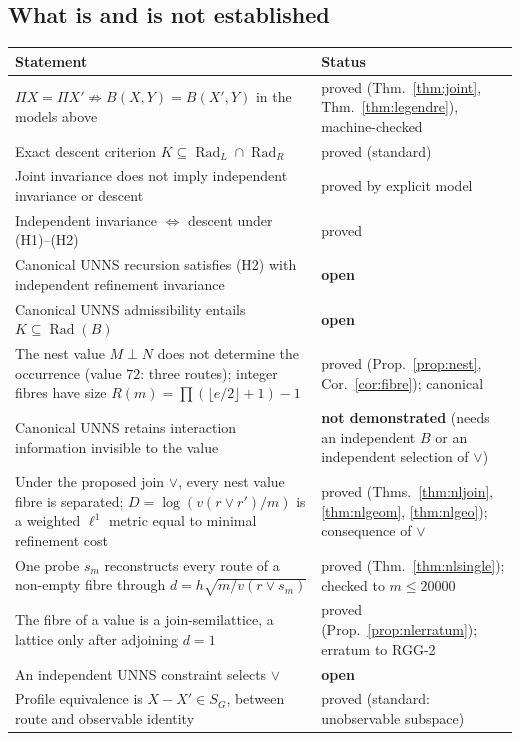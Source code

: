 \documentclass[11pt,a4paper]{article}
\newcommand{\Rad}{\operatorname{Rad}}
\newcommand{\vj}{\mathbin{\vee}}
\theoremstyle{plain}
\theoremstyle{definition}
\begin{document}
\subsection{What is and is not established}
\begin{center}\small
\begin{tabularx}{\textwidth}{@{}>{\raggedright\arraybackslash}X>{\raggedright\arraybackslash}p{}@{}}
\toprule
Statement & Status\\
\midrule
$\Pi X=\Pi X'\not\Rightarrow B(X,Y)=B(X',Y)$ in the models above & proved (Thm.~\ref{thm:joint}, Thm.~\ref{thm:legendre}), machine-checked\\
Exact descent criterion $K\subseteq\Rad_L\cap\Rad_R$ & proved (standard)\\
Joint invariance does not imply independent invariance or descent & proved by explicit model\\
Independent invariance $\Leftrightarrow$ descent under (H1)--(H2) & proved\\
Canonical UNNS recursion satisfies (H2) with independent refinement invariance & \textbf{open}\\
Canonical UNNS admissibility entails $K\subseteq\Rad(B)$ & \textbf{open}\\
The nest value $M\perp N$ does not determine the occurrence (value $72$: three routes); integer fibres have size $R(m)=\prod(\lfloor e/2\rfloor+1)-1$ & proved (Prop.~\ref{prop:nest}, Cor.~\ref{cor:fibre}); canonical\\
Canonical UNNS retains interaction information invisible to the value & \textbf{not demonstrated} (needs an independent $B$ or an independent selection of $\vj$)\\
Under the proposed join $\vj$, every nest value fibre is separated; $D=\log(v(r\vj r')/m)$ is a weighted $\ell^1$ metric equal to minimal refinement cost & proved (Thms.~\ref{thm:nljoin}, \ref{thm:nlgeom}, \ref{thm:nlgeo}); consequence of $\vj$\\
One probe $s_m$ reconstructs every route of a non-empty fibre through $d=h\sqrt{m/v(r\vj s_m)}$ & proved (Thm.~\ref{thm:nlsingle}); checked to $m\le20000$\\
The fibre of a value is a join-semilattice, a lattice only after adjoining $d=1$ & proved (Prop.~\ref{prop:nlerratum}); erratum to RGG-2\\
An independent UNNS constraint selects $\vj$ & \textbf{open}\\
Profile equivalence is $X-X'\in S_G$, between route and observable identity & proved (standard: unobservable subspace)\\

\end{tabularx}
\end{center}
\end{document}
